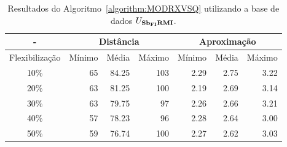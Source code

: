 \begin{table}[!htb]
  \caption{Resultados do Algoritmo~\ref{algorithm:MODRXVSQ} utilizando a base de dados $U_{\textbf{Sb\textsubscript{FI}RMI}}{}$.}
  \label{table:OBVONNLP}
  \centering
  \begin{tabular}{|c|r|r|r|r|r|r|}
    \hline
      -            & \multicolumn{3}{c|}{Distância}             & \multicolumn{3}{c|}{Aproximação}           \\ \hline
    Flexibilização & Mínimo       & Média        & Máximo       & Mínimo       & Média        & Máximo       \\ \hline  
    10\%           & 65           & 84.25        & 103          & 2.29         & 2.75         & 3.22         \\ \hline
    20\%           & 63           & 81.25        & 100          & 2.19         & 2.69         & 3.14         \\ \hline
    30\%           & 63           & 79.75        & 97           & 2.26         & 2.66         & 3.21         \\ \hline
    40\%           & 57           & 78.23        & 96           & 2.28         & 2.64         & 3.00         \\ \hline
    50\%           & 59           & 76.74        & 100          & 2.27         & 2.62         & 3.03         \\ \hline    
  \end{tabular}
\end{table}
